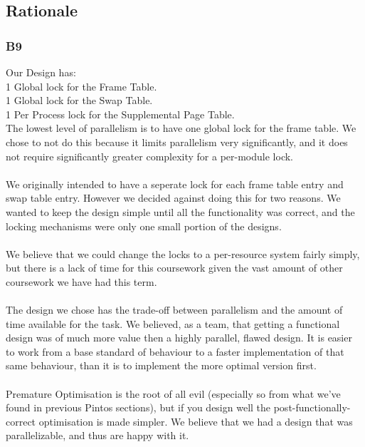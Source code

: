 \documentclass[a4wide, 11pt]{article}
\begin{document}
\subsection{Rationale}
\subsubsection{B9}

Our Design has:\\
\hspace{5mm} 1 Global lock for the Frame Table.\\
\hspace{5mm} 1 Global lock for the Swap Table.\\
\hspace{5mm} 1 Per Process lock for the Supplemental Page Table.\\

The lowest level of parallelism is to have one global lock for the frame table. We chose to not do this because it limits parallelism very significantly, and it does not require significantly greater complexity for a per-module lock.\\
\\
We originally intended to have a seperate lock for each frame table entry and swap table entry. However we decided against doing this for two reasons. We wanted to keep the design simple until all the functionality was correct, and the locking mechanisms were only one small portion of the designs.\\
\\
We believe that we could change the locks to a per-resource system fairly simply, but there is a lack of time for this coursework given the vast amount of other coursework we have had this term.\\
\\
The design we chose has the trade-off between parallelism and the amount of time available for the task. We believed, as a team, that getting a functional design was of much more value then a highly parallel, flawed design. It is easier to work from a base standard of behaviour to a faster implementation of that same behaviour, than it is to implement the more optimal version first.\\
\\ Premature Optimisation is the root of all evil (especially so from what we've found in previous Pintos sections), but if you design well the post-functionally-correct optimisation is made simpler. We believe that we had a design that was parallelizable, and thus are happy with it.
\end{document}
